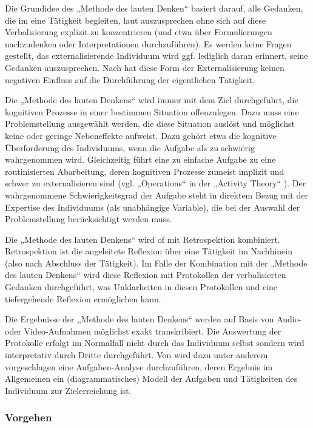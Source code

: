 Die Grundidee des „Methode des lauten Denken“ basiert darauf, alle Gedanken, die im eine Tätigkeit begleiten, laut auszusprechen ohne sich auf diese Verbalisierung explizit zu konzentrieren (und etwa über Formulierungen nachzudenken oder Interpretationen durchzuführen). Es werden keine Fragen gestellt, das externalisierende Individuum wird ggf. lediglich daran erinnert, seine Gedanken auszusprechen. Nach \citet{Van-Someren94} hat diese Form der Externalisierung keinen negativen Einfluss auf die Durchführung der eigentlichen Tätigkeit.

Die „Methode des lauten Denkens“ wird immer mit dem Ziel durchgeführt, die kognitiven Prozesse in einer bestimmen Situation offenzulegen. Dazu muss eine Problemstellung ausgewählt werden, die diese Situation auslöst und möglichst keine oder geringe Nebeneffekte aufweist. Dazu gehört etwa die kognitive Überforderung des Individuums, wenn die Aufgabe als zu schwierig wahrgenommen wird. Gleichzeitig führt eine zu einfache Aufgabe zu eine routinisierten Abarbeitung, deren kognitiven Prozesse zumeist implizit und schwer zu externalisieren sind (vgl. „Operations“ in der „Activity Theory“ \citep{Leontev78}). Der wahrgenommene Schwierigkeitsgrad der Aufgabe steht in direktem Bezug mit der Expertise des Individuums (als unabhängige Variable), die bei der Auswahl der Problemstellung berücksichtigt werden muss.

Die „Methode des lauten Denkens“ wird of mit Retrospektion kombiniert. Retrospektion ist die angeleitete Reflexion über eine Tätigkeit im Nachhinein (also nach Abschluss der Tätigkeit). Im Falle der Kombination mit der „Methode des lauten Denkens“ wird diese Reflexion mit Protokollen der verbalisierten Gedanken durchgeführt, was Unklarheiten in diesen Protokollen und eine tiefergehende Reflexion ermöglichen kann. 

Die Ergebnisse der „Methode des lauten Denkens“ werden auf Basis von Audio- oder Video-Aufnahmen möglichst exakt transkribiert. Die Auswertung der Protokolle erfolgt im Normalfall nicht durch das Individuum selbst sondern wird interpretativ durch Dritte durchgeführt. Von \citet{Van-Someren94} wird dazu unter anderem vorgeschlagen eine Aufgaben-Analyse durchzuführen, deren Ergebnis im Allgemeinen ein (diagrammatisches) Modell der Aufgaben und Tätigkeiten des Individuum zur Zielerreichung ist.

\subsubsection{Vorgehen}

